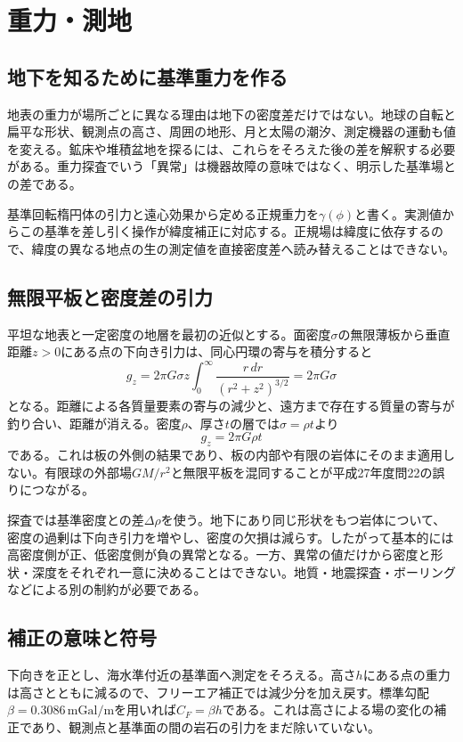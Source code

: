 \chapter{重力・測地}
\section{地下を知るために基準重力を作る}
地表の重力が場所ごとに異なる理由は地下の密度差だけではない。地球の自転と扁平な形状、観測点の高さ、周囲の地形、月と太陽の潮汐、測定機器の運動も値を変える。鉱床や堆積盆地を探るには、これらをそろえた後の差を解釈する必要がある。重力探査でいう「異常」は機器故障の意味ではなく、明示した基準場との差である。

基準回転楕円体の引力と遠心効果から定める正規重力を\(\gamma(\phi)\)と書く。実測値からこの基準を差し引く操作が緯度補正に対応する。正規場は緯度に依存するので、緯度の異なる地点の生の測定値を直接密度差へ読み替えることはできない。

\section{無限平板と密度差の引力}
\label{theory:gravity:slab}
平坦な地表と一定密度の地層を最初の近似とする。面密度\(\sigma\)の無限薄板から垂直距離\(z>0\)にある点の下向き引力は、同心円環の寄与を積分すると
\[
 g_z=2\pi G\sigma z\int_0^\infty
 \frac{r\,dr}{(r^2+z^2)^{3/2}}=2\pi G\sigma
\]
となる。距離による各質量要素の寄与の減少と、遠方まで存在する質量の寄与が釣り合い、距離が消える。密度\(\rho\)、厚さ\(t\)の層では\(\sigma=\rho t\)より
\[
 g_z=2\pi G\rho t
\]
である。これは板の外側の結果であり、板の内部や有限の岩体にそのまま適用しない。有限球の外部場\(GM/r^2\)と無限平板を混同することが平成27年度問22の誤りにつながる。

探査では基準密度との差\(\Delta\rho\)を使う。地下にあり同じ形状をもつ岩体について、密度の過剰は下向き引力を増やし、密度の欠損は減らす。したがって基本的には高密度側が正、低密度側が負の異常となる。一方、異常の値だけから密度と形状・深度をそれぞれ一意に決めることはできない。地質・地震探査・ボーリングなどによる別の制約が必要である。

\section{補正の意味と符号}
\label{theory:gravity:corrections}
下向きを正とし、海水準付近の基準面へ測定をそろえる。高さ\(h\)にある点の重力は高さとともに減るので、フリーエア補正では減少分を加え戻す。標準勾配\(\beta=0.3086\,\mathrm{mGal/m}\)を用いれば\(C_F=\beta h\)である。これは高さによる場の変化の補正であり、観測点と基準面の間の岩石の引力をまだ除いていない。

